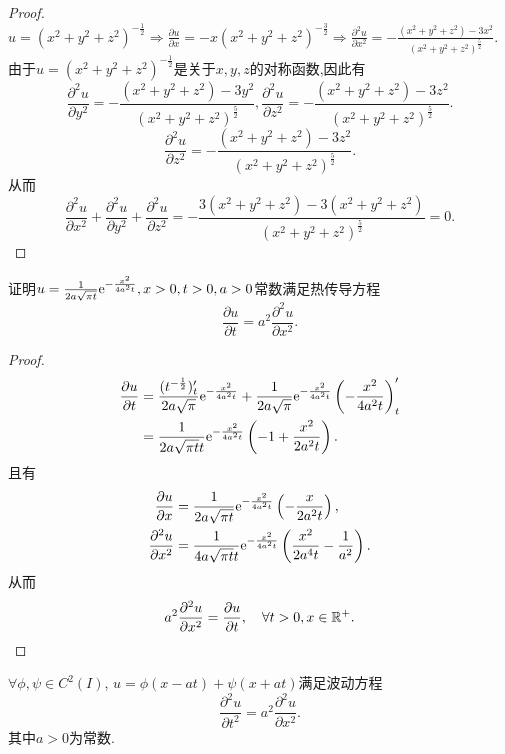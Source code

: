 \begin{proof}
    $u = (x^2 + y^2 + z^2)^{-\frac{1}{2}} \Rightarrow \frac{\partial u}{\partial x} = -x (x^2 + y^2 + z^2)^{-\frac{3}{2}} \Rightarrow \frac{\partial^2 u}{\partial x^2} = - \frac{(x^2+y^2+z^2)-3x^2}{(x^2+y^2+z^2)^{\frac{5}{2}}}$.
    由于$u = (x^2 + y^2 + z^2)^{-\frac{1}{2}}$是关于$x,y,z$的对称函数,因此有
    $$
    \frac{\partial^2 u}{\partial y^2} = - \frac{(x^2+y^2+z^2)-3y^2}{(x^2+y^2+z^2)^{\frac{5}{2}}}, \frac{\partial^2 u}{\partial z^2} = - \frac{(x^2+y^2+z^2)-3z^2}{(x^2+y^2+z^2)^{\frac{5}{2}}}.
    $$
    $$
    \frac{\partial^2 u}{\partial z^2} = - \frac{(x^2+y^2+z^2)-3z^2}{(x^2+y^2+z^2)^{\frac{5}{2}}}.
    $$
    从而
    $$
    \frac{\partial^2 u}{\partial x^2} + \frac{\partial^2 u}{\partial y^2} + \frac{\partial^2 u}{\partial z^2} = - \frac{3(x^2+y^2+z^2) - 3(x^2+y^2+z^2)}{(x^2+y^2+z^2)^{\frac{5}{2}}} = 0.
    $$
\end{proof}

\begin{example}
    证明$u = \frac{1}{2a \sqrt{\pi t}} \mathrm{e}^{ - \frac{x^2}{4a^2 t}}, x >0, t>0, a>0$常数满足热传导方程
    $$
    \frac{\partial u}{\partial t} = a^2 \frac{\partial^2 u}{\partial x^2}.
    $$
\end{example}

\begin{proof}
    \begin{align*}
        \frac{\partial u}{\partial t} & = \frac{(t^{-\frac12})_t'}{2a \sqrt \pi} \mathrm{e}^{-\frac{x^2}{4a^2 t}} + \frac{1}{2a \sqrt \pi} \mathrm{e}^{-\frac{x^2}{4a^2 t}} \left( - \frac{x^2}{4a^2t} \right)_t' \\
        &= \frac{1}{2a \sqrt{\pi t} t} \mathrm{e}^{-\frac{x^2}{4a^2 t}}\left( -1 + \frac{x^2}{2a^2 t} \right).
    \end{align*}
        且有
        \begin{align*}
            \frac{\partial u}{\partial x} & = \frac{1}{2a \sqrt{\pi t}} \mathrm{e}^{- \frac{x^2}{4a^2 t}} \left( - \frac{x}{2a^2 t} \right), \\
            \frac{\partial^2 u}{\partial x^2} & = \frac{1}{4a \sqrt{\pi t}t} \mathrm{e}^{- \frac{x^2}{4a^2 t}} \left( \frac{x^2}{2a^4 t} - \frac{1}{a^2} \right).
        \end{align*}
        从而
        $$
        a^2 \frac{\partial^2 u}{\partial x^2} = \frac{\partial u}{\partial t}, \quad \forall t >0, x \in \mathbb{R}^+.
        $$
\end{proof}

\begin{example}
    $\forall \phi,\psi \in C^2(I)$, $u = \phi(x - at) + \psi(x+ at)$满足波动方程
    $$
    \frac{\partial^2 u}{\partial t^2} = a^2 \frac{\partial^2 u}{\partial x^2}.
    $$
    其中$a >0$为常数.
\end{example}

